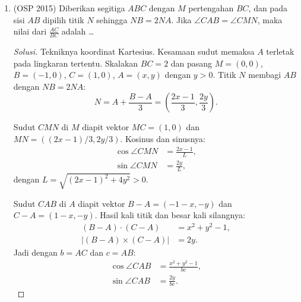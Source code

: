 \documentclass[12pt]{scrartcl}
\begin{document}
\begin{enumerate}[resume]
	\item (OSP 2015)
	Diberikan segitiga $ABC$ dengan $M$ pertengahan $BC$, dan pada sisi
	$AB$ dipilih titik $N$ sehingga $NB=2NA$. Jika
	$\angle CAB=\angle CMN$, maka nilai dari $\frac{AC}{BC}$ adalah
	\dots
\begin{center}
\end{center}
	\begin{proof}[Solusi]
	Tekniknya koordinat Kartesius. Kesamaan sudut memaksa $A$ terletak
	pada lingkaran tertentu. Skalakan $BC = 2$ dan pasang $M = (0,0)$,
	$B = (-1,0)$, $C = (1,0)$, $A = (x,y)$ dengan $y > 0$. Titik $N$
	membagi $AB$ dengan $NB = 2NA$:
	\[ N = A + \frac{B - A}{3}
	= \left(\frac{2x - 1}{3}, \frac{2y}{3}\right). \]

	Sudut $CMN$ di $M$ diapit vektor $MC = (1,0)$ dan
	$MN = ((2x-1)/3, 2y/3)$. Kosinus dan sinusnya:
	\begin{align*}
	\cos\angle CMN &= \frac{2x - 1}{L}, \\
	\sin\angle CMN &= \frac{2y}{L},
	\end{align*}
	dengan $L = \sqrt{(2x-1)^2 + 4y^2} > 0$.

	Sudut $CAB$ di $A$ diapit vektor $B - A = (-1-x, -y)$ dan
	$C - A = (1-x, -y)$. Hasil kali titik dan besar kali silangnya:
	\begin{align*}
	(B - A)\cdot(C - A) &= x^2 + y^2 - 1, \\
	|(B - A)\times(C - A)| &= 2y.
	\end{align*}
	Jadi dengan $b = AC$ dan $c = AB$:
	\begin{align*}
	\cos\angle CAB &= \frac{x^2 + y^2 - 1}{bc}, \\
	\sin\angle CAB &= \frac{2y}{bc}.
	\end{align*}


\end{proof}
\end{enumerate}
\end{document}
